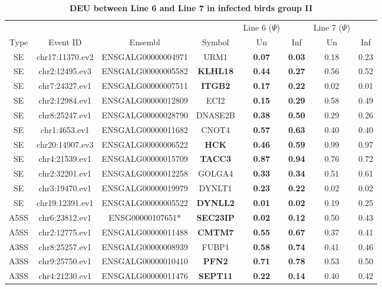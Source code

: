 \documentclass[10pt]{article}
\begin{document}
\begin{table}[!ht]
\caption{
\bf{DEU between Line 6 and Line 7 in infected birds group II}}
\begin{tabular}{cccccccc}
\hline
& & & & Line 6 ($\Psi$) & & Line 7 ($\Psi$) & \\
Type & Event ID & Ensembl & Symbol  & Un & Inf & Un & Inf \\
\hline
SE & chr17:11370.ev2 & ENSGALG00000004971 & URM1 & \textbf{0.07} & \textbf{0.03} & 0.18 & 0.23 \\
SE & chr2:12495.ev3 & ENSGALG00000005582 & \textbf{KLHL18} & \textbf{0.44} & \textbf{0.27} & 0.56 & 0.52 \\
SE & chr7:24327.ev1 & ENSGALG00000007511 & \textbf{ITGB2} & \textbf{0.17} & \textbf{0.22} & 0.02 & 0.01 \\
SE & chr2:12984.ev1 & ENSGALG00000012809 & ECI2 & \textbf{0.15} & \textbf{0.29} & 0.58 & 0.49 \\
SE & chr8:25247.ev1 & ENSGALG00000028790 & DNASE2B & \textbf{0.38} & \textbf{0.50} & 0.29 & 0.26 \\
SE & chr1:4653.ev1 & ENSGALG00000011682 & CNOT4 & \textbf{0.57} & \textbf{0.63} & 0.40 & 0.40 \\
SE & chr20:14907.ev3 & ENSGALG00000006522 & \textbf{HCK} & \textbf{0.46} & \textbf{0.59} & 0.99 & 0.97 \\
SE & chr4:21539.ev1 & ENSGALG00000015709 & \textbf{TACC3} & \textbf{0.87} & \textbf{0.94} & 0.76 & 0.72 \\
SE & chr2:32201.ev1 & ENSGALG00000012258 & GOLGA4 & \textbf{0.33} & \textbf{0.34} & 0.51 & 0.61 \\
SE & chr3:19470.ev1 & ENSGALG00000019979 & DYNLT1 & \textbf{0.23} & \textbf{0.22} & 0.02 & 0.02 \\
SE & chr19:12391.ev1 & ENSGALG00000005522 & \textbf{DYNLL2} & \textbf{0.01} & \textbf{0.02} & 0.19 & 0.25 \\
A5SS & chr6:23812.ev1 & ENSG00000107651* & \textbf{SEC23IP} & \textbf{0.02} & \textbf{0.12} & 0.50 & 0.43 \\
A5SS & chr2:12775.ev1 & ENSGALG00000011488 & \textbf{CMTM7} & \textbf{0.55} & \textbf{0.67} & 0.37 & 0.41 \\
A3SS & chr8:25257.ev1 & ENSGALG00000008939 & FUBP1 & \textbf{0.58} & \textbf{0.74} & 0.41 & 0.46 \\
A3SS & chr9:25750.ev1 & ENSGALG00000010410 & \textbf{PFN2} & \textbf{0.71} & \textbf{0.78} & 0.53 & 0.50 \\
A3SS & chr4:21230.ev1 & ENSGALG00000011476 & \textbf{SEPT11} & \textbf{0.22} & \textbf{0.14} & 0.40 & 0.42 \\

\end{tabular}
\end{table}
\end{document}
